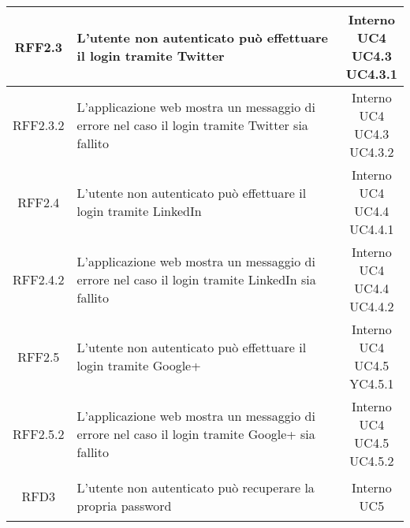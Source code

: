 \begin{longtable}{|c|p{8cm}|c|}
\hypertarget{RFF2.3}{RFF2.3} & L'utente non autenticato può effettuare il login tramite Twitter & \makecell*{Interno\\UC4\\UC4.3\\UC4.3.1} \\
\hline
\hypertarget{RFF2.3.2}{RFF2.3.2} & L'applicazione web mostra un messaggio di errore nel caso il login tramite Twitter sia fallito & \makecell*{Interno\\UC4\\UC4.3\\UC4.3.2} \\
\hline

\hypertarget{RFF2.4}{RFF2.4} & L'utente non autenticato può effettuare il login tramite LinkedIn & \makecell*{Interno\\UC4\\UC4.4\\UC4.4.1} \\
\hline
\hypertarget{RFF2.4.2}{RFF2.4.2} & L'applicazione web mostra un messaggio di errore nel caso il login tramite LinkedIn sia fallito & \makecell*{Interno\\UC4\\UC4.4\\UC4.4.2} \\
\hline

\hypertarget{RFF2.5}{RFF2.5} & L'utente non autenticato può effettuare il login tramite Google+ & \makecell*{Interno\\UC4\\UC4.5\\YC4.5.1} \\
\hline
\hypertarget{RFF2.5.2}{RFF2.5.2} & L'applicazione web mostra un messaggio di errore nel caso il login tramite Google+ sia fallito & \makecell*{Interno\\UC4\\UC4.5\\UC4.5.2} \\
\hline

\hypertarget{RFD3}{RFD3} & L'utente non autenticato può recuperare la propria password & \makecell*{Interno\\UC5} \\
\hline


\end{longtable}
